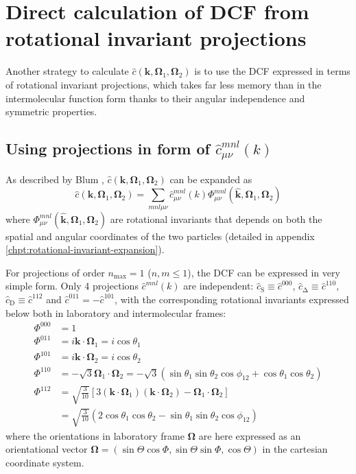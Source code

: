 \section{Direct calculation of DCF from rotational invariant projections}

Another strategy to calculate $\hat{c}(\mathbf{k},\mathbf{\Omega}_{1},\mathbf{\Omega}_{2})$
is to use the \acs{DCF} expressed in terms of rotational invariant
projections, which takes far less memory than in the intermolecular
function form thanks to their angular independence and symmetric properties. 

\subsection{Using projections in form of $\hat{c}_{\mu\nu}^{mnl}(k)$\label{subsec:Using-projections-in}}

As described by Blum \citep{Blum_I}, $\hat{c}(\mathbf{k},\mathbf{\Omega}_{1},\mathbf{\Omega}_{2})$
can be expanded as
\begin{equation}
\hat{c}(\mathbf{k},\mathbf{\Omega}_{1},\mathbf{\Omega}_{2})=\sum_{mnl\mu\nu}\hat{c}_{\mu\nu}^{mnl}(k)\Phi_{\mu\nu}^{mnl}(\mathbf{\hat{k}},\mathbf{\Omega}_{1},\mathbf{\Omega}_{2})
\end{equation}
where $\Phi_{\mu\nu}^{mnl}(\mathbf{\hat{k}},\mathbf{\Omega}_{1},\mathbf{\Omega}_{2})$
are rotational invariants that depends on both the spatial and angular
coordinates of the two particles (detailed in appendix \ref{chpt:rotational-invariant-expansion}).

For projections of order $n_{\mathrm{max}}=1$ ($n,m\leq1$), the
\acs{DCF} can be expressed in very simple form. Only 4 projections
$\hat{c}^{mnl}(k)$ are independent: $\hat{c}_{\mathrm{S}}\equiv\hat{c}^{000}$,
$\hat{c}_{\mathrm{\Delta}}\equiv\hat{c}^{110}$, $\hat{c}_{\mathrm{D}}\equiv\hat{c}^{112}$
and $\hat{c}^{011}=-\hat{c}^{101}$, with the corresponding rotational
invariants expressed below both in laboratory and intermolecular frames:
\begin{align}
\Phi^{000} & =1\nonumber \\
\Phi^{011} & =i\mathbf{k}\cdot\mathbf{\Omega}_{1}=i\cos\theta_{1}\nonumber \\
\Phi^{101} & =i\mathbf{k}\cdot\mathbf{\Omega}_{2}=i\cos\theta_{2}\nonumber \\
\Phi^{110} & =-\sqrt{3}\mathbf{\Omega}_{1}\cdot\mathbf{\Omega}_{2}=-\sqrt{3}(\sin\theta_{1}\sin\theta_{2}\cos\phi_{12}+\cos\theta_{1}\cos\theta_{2})\nonumber \\
\Phi^{112} & =\sqrt{\frac{3}{10}}\left[3(\mathbf{k}\cdot\mathbf{\Omega}_{1})(\mathbf{k}\cdot\mathbf{\Omega}_{2})-\mathbf{\Omega}_{1}\cdot\mathbf{\Omega}_{2}\right]\\
 & =\sqrt{\frac{3}{10}}\left(2\cos\theta_{1}\cos\theta_{2}-\sin\theta_{1}\sin\theta_{2}\cos\phi_{12}\right)\nonumber 
\end{align}
where the orientations in laboratory frame $\mathbf{\Omega}$ are
here expressed as an orientational vector $\mathbf{\Omega}=(\sin\Theta\cos\Phi,\sin\Theta\sin\Phi,\cos\Theta)$
in the cartesian coordinate system. 


